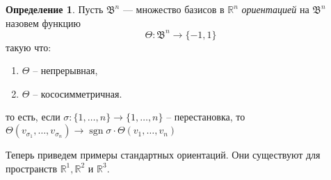 \documentclass[a5paper]{article}
\newcounter{through}
\theoremstyle{plain}
\theoremstyle{definition}
\newtheorem{definition}[through]{Определение}
\numberwithin{through}{section}
\numberwithin{equation}{section}
\DeclareMathOperator{\sgn}{sgn}
\begin{document}
\begin{definition}
	Пусть $\mathfrak{B}^n$ --- множество базисов в $\mathbb{R}^n$
	\textit{ориентацией} на $\mathfrak{B}^n$ назовем функцию 
	\[ \Theta: \mathfrak{B}^n \to \{-1, 1 \} \]
	такую что:
	\begin{enumerate}
		\item 
		$\Theta$ -- непрерывная,
		
		\item
		$\Theta$ -- кососимметричная.
		

	\end{enumerate}
		то есть, если $\sigma : \{ 1,\ldots, n \} \to \{ 1,\ldots, n \}$ -- перестановка, то 
$\Theta(v_{\sigma_1},\ldots, v_{\sigma_n}) \to 
\sgn \sigma \cdot\Theta(v_{1},\ldots, v_{n})$
\end{definition}

Теперь приведем примеры стандартных ориентаций. 
Они существуют для пространств $\mathbb{R}^1, \mathbb{R}^2$ и $\mathbb{R}^3$.
\end{document}
